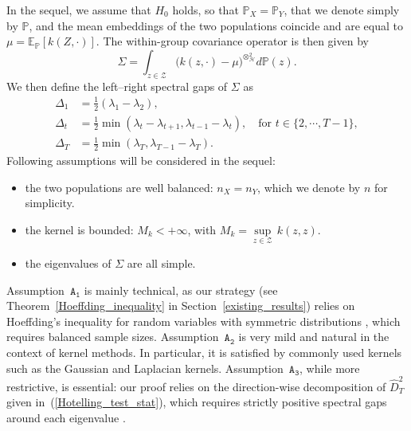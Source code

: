 \documentclass[twoside,11pt]{article}
\newcommand{\Hk}{\mathcal{H}}
\newcommand{\nb}{n}
\newcommand{\PP}{\mathbb{P}}%
\newcommand{\EE}{\mathbb{E}}%
\newcommand{\A}[1]{$\mathtt{A_#1}$}
\renewcommand{\P}{\mathbb{P}}
\begin{document}
In the sequel, we assume that $H_0$ holds, so that $\PP_X = \PP_Y$, that we denote simply by $\P$, and the mean embeddings of the two populations coincide and are equal to $\mu = \EE_{\PP}[k(Z,\cdot)]$. The within-group covariance operator is then given by
\[\Sigma = \int_{z \in \mathcal{Z}} \Big( k(z,\cdot) - \mu \Big)^{\otimes^2_{\Hk}} d\PP(z).\]
	We then define the left–right spectral gaps of $\Sigma$ as
	\begin{align*}
		\Delta_1 &= \frac{1}{2} \left( \lambda_1 - \lambda_{2} \right), \\
		\Delta_t &= \frac{1}{2} \min \left( \lambda_t - \lambda_{t+1} , \lambda_{t-1} - \lambda_t \right), \quad \text{for } t \in \{2, \cdots, T-1\}, \\
		\Delta_T &= \frac{1}{2} \min \left( \lambda_T , \lambda_{T-1} - \lambda_T \right).
	\end{align*}
	Following assumptions will be considered in the sequel:
	\begin{itemize}
		\item[\A{1}] the two populations are well balanced: $n_X = n_Y$, which we denote by $\nb$ for simplicity.
		\item[\A{2}] the kernel is bounded: $M_k < +\infty$, with $M_k = \underset{z \in \mathcal{Z}}{\sup} \, k(z, z)$.
		\item[\A{3}] the eigenvalues of $\Sigma$ are all simple.
	\end{itemize}
Assumption~\A{1} is mainly technical, as our strategy (see Theorem~\ref{Hoeffding_inequality} in Section~\ref{existing_results}) relies on Hoeffding's inequality for random variables with symmetric distributions \citep{bertail2008exponential}, which requires balanced sample sizes. Assumption~\A{2} is very mild and natural in the context of kernel methods. In particular, it is satisfied by commonly used kernels such as the Gaussian and Laplacian kernels.  Assumption~\A{3}, while more restrictive, is essential:  our proof relies on the direction-wise decomposition of $\widehat{D}^2_T$ given in~(\ref{Hotelling_test_stat}), which requires strictly positive spectral gaps around each eigenvalue \citep{blanchard2007statistical,zwald2005convergence,ozier2024extending}.

\end{document}
